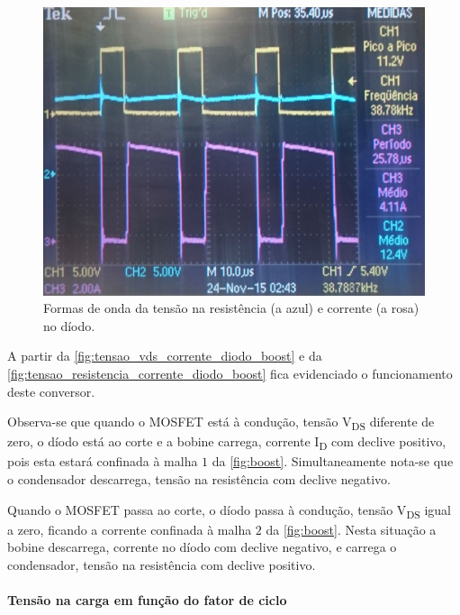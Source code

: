\documentclass[a4paper,11pt]{article}
\numberwithin{equation}{section}
\begin{document}
\begin{figure}[H]
	\centering
	\includegraphics[keepaspectratio=true, scale=0.175]{img/figs/tensao_resistencia_corrente_diodo_boost}
	\caption{Formas de onda da tensão na resistência (a azul) e corrente (a rosa) no díodo.}
	\label{fig:tensao_resistencia_corrente_diodo_boost}
	\vspace{-0.8em}
\end{figure}

A partir da \autoref{fig:tensao_vds_corrente_diodo_boost} e da \autoref{fig:tensao_resistencia_corrente_diodo_boost} fica evidenciado o funcionamento deste conversor. 

Observa-se que quando o MOSFET está à condução, tensão V\textsubscript{DS} diferente de zero, o díodo está ao corte e a bobine carrega, corrente I\textsubscript{D} com declive positivo, pois esta estará confinada à malha $1$ da \autoref{fig:boost}. Simultaneamente nota-se que o condensador descarrega, tensão na resistência com declive negativo.

Quando o MOSFET passa ao corte, o díodo passa à condução, tensão V\textsubscript{DS} igual a zero, ficando a corrente confinada à malha $2$ da \autoref{fig:boost}. Nesta situação a bobine descarrega, corrente no díodo com declive negativo, e carrega o condensador, tensão na resistência com declive positivo.

\paragraph{Tensão na carga em função do fator de ciclo}\mbox{}\
\end{document}
